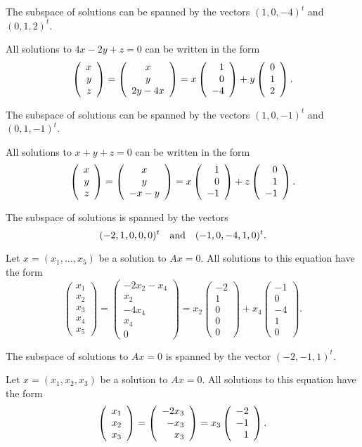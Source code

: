 \documentclass{ximera}
\begin{document}
 \ans The subspace of solutions can be spanned by the vectors 
$(1,0,-4)^t$ and $(0,1,2)^t$.

\soln All solutions to $4x - 2y + z = 0$ can be written in the form
\[
\left(\begin{array}{r} x \\ y \\ z\end{array}\right) = \left(\begin{array}{c} x \\ y \\ 2y - 4x\end{array}\right)
= x\left(\begin{array}{r} 1 \\ 0 \\ -4\end{array}\right) + y\left(\begin{array}{r} 0 \\ 1 \\ 2\end{array}\right).
\]

  \ans The subspace of solutions can be spanned by the vectors 
$(1,0,-1)^t$ and $(0,1,-1)^t$.

\soln All solutions to $x + y + z = 0$ can be written in the form
\[
\left(\begin{array}{r} x \\ y \\ z\end{array}\right) = \left(\begin{array}{c} x \\ y \\ -x-y\end{array}\right)
= x\left(\begin{array}{r} 1 \\ 0 \\ -1\end{array}\right) + z\left(\begin{array}{r} 0 \\ 1 \\ -1\end{array}\right).
\]

\ans The subspace of solutions is spanned by the vectors
\[
(-2,1,0,0,0)^t \quad\mbox{and}\quad (-1,0,-4,1,0)^t.
\]

\soln Let $x = (x_1,\dots ,x_5)$ be a solution to $Ax = 0$.  All
solutions to this equation have the form
\[
\left(\begin{array}{r} x_1 \\ x_2 \\ x_3 \\ x_4 \\ x_5
\end{array}\right) = \left(\begin{array}{c} -2x_2 - x_4 \\ x_2 \\
-4x_4 \\ x_4 \\ 0 \end{array}\right) = x_2\left(\begin{array}{r}
-2 \\ 1 \\ 0 \\ 0 \\ 0 \end{array}\right) +
x_4\left(\begin{array}{r} -1 \\ 0 \\ -4 \\ 1 \\ 0
\end{array}\right).
\]

\ans The subspace of solutions to $Ax = 0$ is spanned by the vector
$(-2,-1,1)^t$.

\soln Let $x = (x_1,x_2,x_3)$ be a solution to $Ax = 0$.  All solutions
to this equation have the form
\[
\left(\begin{array}{r} x_1 \\ x_2 \\ x_3\end{array}\right) = \left(\begin{array}{r} -2x_3 \\ -x_3 \\ x_3\end{array}\right) =
x_3\left(\begin{array}{r} -2 \\ -1 \\ 1\end{array}\right).
\]
\end{document}
